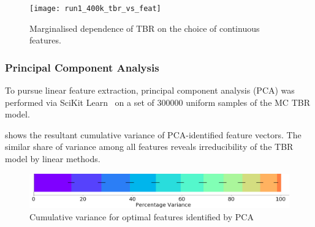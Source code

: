 \begin{figure}[h]
	\centering
	\texttt{[image: run1\_400k\_tbr\_vs\_feat]}
	\caption{Marginalised dependence of TBR on the choice of continuous
	features.}
  \label{fig:tbr-vs-features}
\end{figure}


\subsubsection{Principal Component Analysis}

To pursue linear feature extraction, principal component analysis (PCA)
\cite{Jolliffe2016} was performed via SciKit Learn~\cite{scikit-learn} on a set
of \num{300000} uniform samples of the MC TBR model. %

 shows the resultant cumulative variance of PCA-identified feature vectors. The similar share of variance among all features
reveals irreducibility of the TBR model by linear methods.

\begin{figure}[h]
  \centering
    \includegraphics[width=0.6\linewidth]{fig2_pca.jpg}
    \caption{Cumulative variance for optimal features identified by PCA}
  \label{fig:pca}
\end{figure}

